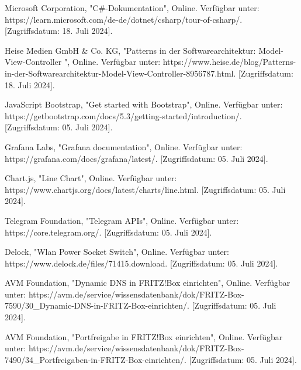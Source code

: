 \documentclass[conference]{IEEEtran}
\begin{document}
\begin{thebibliography}{00}
Microsoft Corporation, "C\#-Dokumentation", Online. Verfügbar unter: https://learn.microsoft.com/de-de/dotnet/csharp/tour-of-csharp/. [Zugriffsdatum: 18. Juli 2024].

Heise Medien GmbH \& Co. KG, "Patterns in der Softwarearchitektur: Model-View-Controller ", Online. Verfügbar unter: https://www.heise.de/blog/Patterns-in-der-Softwarearchitektur-Model-View-Controller-8956787.html. [Zugriffsdatum: 18. Juli 2024].

JavaScript Bootstrap, "Get started with Bootstrap", Online. Verfügbar unter: https://getbootstrap.com/docs/5.3/getting-started/introduction/. [Zugriffsdatum: 05. Juli 2024].

Grafana Labs, "Grafana documentation", Online. Verfügbar unter: https://grafana.com/docs/grafana/latest/. [Zugriffsdatum: 05. Juli 2024].

Chart.js, "Line Chart", Online. Verfügbar unter: https://www.chartjs.org/docs/latest/charts/line.html. [Zugriffsdatum: 05. Juli 2024].

Telegram Foundation, "Telegram APIs", Online. Verfügbar unter: https://core.telegram.org/. [Zugriffsdatum: 05. Juli 2024].

Delock, "Wlan Power Socket Switch", Online. Verfügbar unter: https://www.delock.de/files/71415.download. [Zugriffsdatum: 05. Juli 2024].

AVM Foundation, "Dynamic DNS in FRITZ!Box einrichten", Online. Verfügbar unter: https://avm.de/service/wissensdatenbank/dok/FRITZ-Box-7590/30\_Dynamic-DNS-in-FRITZ-Box-einrichten/. [Zugriffsdatum: 05. Juli 2024].

AVM Foundation, "Portfreigabe in FRITZ!Box einrichten", Online. Verfügbar unter: https://avm.de/service/wissensdatenbank/dok/FRITZ-Box-7490/34\_Portfreigaben-in-FRITZ-Box-einrichten/. [Zugriffsdatum: 05. Juli 2024].

\end{thebibliography}
\end{document}
